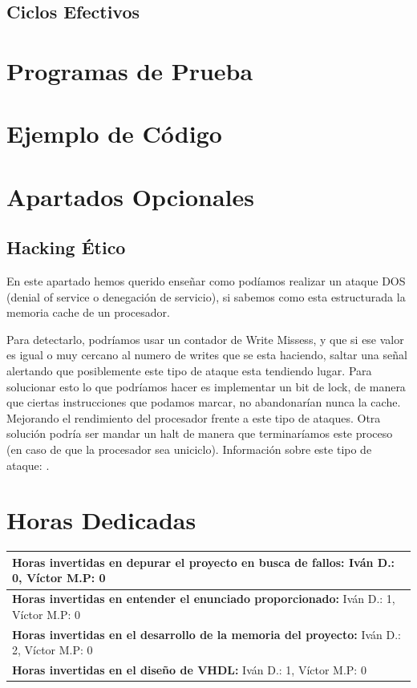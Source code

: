 \documentclass{article}
\newcommand{\horasVhdl}[2]{\textbf{Horas invertidas en el diseño de VHDL:} Iván D.: #1, Víctor M.P: #2\par\nointerlineskip}
\newcommand{\horasEntenderEnunciado}[2]{\textbf{Horas invertidas en entender el enunciado proporcionado:} Iván D.: #1, Víctor M.P: #2\par\nointerlineskip}
\newcommand{\horasDepuracion}[2]{\textbf{Horas invertidas en depurar el proyecto en busca de fallos:} Iván D.: #1, Víctor M.P: #2\par\nointerlineskip}
\newcommand{\horasMemoria}[2]{\textbf{Horas invertidas en el desarrollo de la memoria del proyecto:} Iván D.: #1, Víctor M.P: #2\par\nointerlineskip}
\begin{document}
\subsection{Ciclos Efectivos}
\lipsum[9-10]

\section{Programas de Prueba}
\lipsum[10-12]

\section{Ejemplo de Código}
\lipsum[13-14]

\section{Apartados Opcionales}
\subsection{Hacking Ético}
En este apartado hemos querido enseñar como podíamos realizar un ataque DOS (denial of service o denegación de servicio), si sabemos como esta estructurada la memoria cache de un procesador.\par
Para detectarlo, podríamos usar un contador de Write Missess, y que si ese valor es igual o muy cercano al numero de writes que se esta haciendo, saltar una señal alertando que posiblemente este tipo de ataque esta tendiendo lugar. 
Para solucionar esto lo que podríamos hacer es implementar un bit de lock, de manera que ciertas instrucciones que podamos marcar, no abandonarían nunca la cache. Mejorando el rendimiento del procesador frente a este tipo de ataques. Otra solución podría ser mandar un 
halt de manera que terminaríamos este proceso (en caso de que la procesador sea uniciclo). 
Información sobre este tipo de ataque: \cite{BackCache}.

\newpage

\section{Horas Dedicadas}

\begin{table}[h]
\centering
\begin{tabularx}{\textwidth}{|X|}
\hline
\horasDepuracion{0}{0} \\
\hline
\horasEntenderEnunciado{1}{0} \\
\hline
\horasMemoria{2}{0} \\
\hline
\horasVhdl{1}{0} \\
\hline
\end{tabularx}
\end{table}
\end{document}
